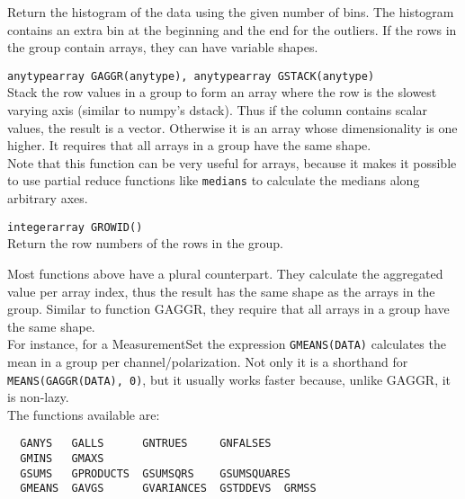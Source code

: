 \begin{description}
    Return the histogram of the data using the given number of bins.
    The histogram contains an extra bin at the beginning and the end
    for the outliers. If the rows in the group contain arrays, they
    can have variable shapes.
  \item[] \texttt{anytypearray GAGGR(anytype), anytypearray GSTACK(anytype)}\\
    Stack the row values in a group to form an array where the row is
    the slowest varying axis (similar to numpy's dstack). Thus if the
    column contains scalar values, the result is a vector. Otherwise
    it is an array whose dimensionality is one higher. It requires
    that all arrays in a group have the same shape.
    \\Note that this function can be very useful for arrays, because it
    makes it possible to use partial reduce functions like
    \texttt{medians} to calculate the medians along arbitrary axes.
  \item[] \texttt{integerarray GROWID()}\\
    Return the row numbers of the rows in the group.
\end{description}
Most functions above have a plural counterpart. They calculate the aggregated
value per array index, thus the result has the same shape as the
arrays in the group. Similar to function GAGGR, they require that all
arrays in a group have the same shape. 
\\For instance, for a MeasurementSet the expression
\texttt{GMEANS(DATA)} calculates the mean in a group per channel/polarization.
Not only it is a shorthand for \texttt{MEANS(GAGGR(DATA), 0)}, but it
usually works faster because, unlike GAGGR, it is non-lazy.
\\The functions available are:
\begin{verbatim}
  GANYS   GALLS      GNTRUES     GNFALSES
  GMINS   GMAXS
  GSUMS   GPRODUCTS  GSUMSQRS    GSUMSQUARES
  GMEANS  GAVGS      GVARIANCES  GSTDDEVS  GRMSS
\end{verbatim}


